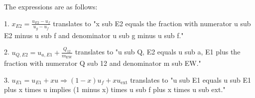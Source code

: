 The expressions are as follows:

1. \( x_{E2} = \frac{u_{E2} - u_f}{u_g - u_f} \) translates to "x sub E2 equals the fraction with numerator u sub E2 minus u sub f and denominator u sub g minus u sub f."

2. \( u_{Q,E2} = u_{a,E1} + \frac{Q_{12}}{m_{\text{EW}}} \) translates to "u sub Q, E2 equals u sub a, E1 plus the fraction with numerator Q sub 12 and denominator m sub EW."

3. \( u_{E1} = u_{E1} + x u \Rightarrow (1-x) u_f + x u_{\text{ext}} \) translates to "u sub E1 equals u sub E1 plus x times u implies (1 minus x) times u sub f plus x times u sub ext."